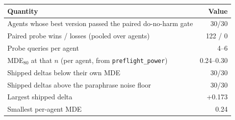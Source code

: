 \begin{tabular}{lr}
\toprule
Quantity & Value \\
\midrule
Agents whose best version passed the paired do-no-harm gate & 30/30 \\
Paired probe wins / losses (pooled over agents) & 122 / 0 \\
Probe queries per agent & 4--6 \\
MDE$_{80}$ at that $n$ (per agent, from \texttt{preflight\_power}) & 0.24--0.30 \\
Shipped deltas below their own MDE & 30/30 \\
Shipped deltas above the paraphrase noise floor & 30/30 \\
Largest shipped delta & +0.173 \\
Smallest per-agent MDE & 0.24 \\
\bottomrule
\end{tabular}
